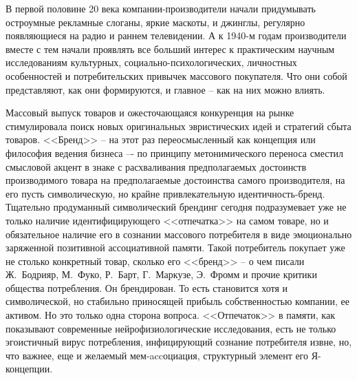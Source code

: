 В первой половине 20 века компании-производители начали придумывать остроумные
рекламные слоганы, яркие маскоты, и  джинглы, регулярно появляющиеся на радио и
раннем телевидении. А к 1940-м годам производители вместе с тем начали проявлять
все больший интерес к практическим научным исследованиям культурных,
социально-психологических, личностных особенностей и потребительских привычек массового
покупателя. Что они собой представляют, как они формируются, и главное -- как на них можно
влиять. \autocite{kotlergrayson}

Массовый выпуск товаров и ожесточающаяся конкуренция на рынке стимулировала поиск
новых оригинальных эвристических идей и стратегий сбыта товаров. <<Бренд>> -- на
этот раз переосмысленный как концепция или философия ведения бизнеса –- по
принципу метонимического переноса сместил смысловой акцент в знаке с расхваливания
предполагаемых достоинств производимого товара на предполагаемые достоинства самого
производителя, на его пусть символическую, но крайне привлекательную  идентичность-бренд.
Тщательно продуманный символический брендинг сегодня подразумевает уже не только
наличие идентифицирующего <<отпечатка>> на самом товаре, но и обязательное наличие
его в сознании массового потребителя в виде эмоционально заряженной позитивной
ассоциативной памяти. Такой потребитель покупает уже не столько конкретный товар,
сколько его <<бренд>> -- о чем писали Ж.~Бодрияр, М.~Фуко, Р.~Барт, Г.~Маркузе, Э.~Фромм
и прочие критики общества потребления. Он брендирован. То есть становится хотя и
символической, но стабильно приносящей прибыль собственностью компании, ее активом.
Но это только одна сторона вопроса. <<Отпечаток>> в памяти, как показывают
современные нейрофизиологические исследования, есть не только эгоистичный вирус
потребления, инфицирующий сознание потребителя извне, но, что важнее, еще и желаемый
мем-accоциация, структурный элемент его
Я-концепции.\autocite{browdy2006}\autocite{mesheryakov2004}

